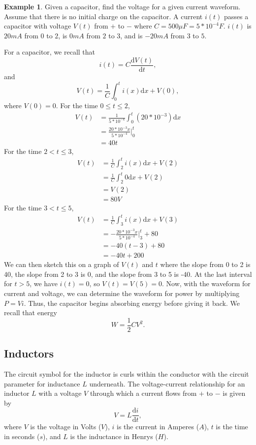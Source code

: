 \documentclass[11pt]{article}
\theoremstyle{plain} %
\theoremstyle{definition}
\theoremstyle{example}
\newtheorem*{example}{Example}
\theoremstyle{remark}
\begin{document}
\begin{example}
Given a capacitor, find the voltage for a given current waveform. Assume that there is no initial charge on the capacitor. A current $i(t)$ passes a capacitor with voltage $V(t)$ from $+$ to $-$ where $C = 500\mu F = 5*10^{-4}F$. $i(t)$ is $20mA$ from $0$ to $2$, is $0mA$ from $2$ to $3$, and is $-20mA$ from $3$ to $5$.
\end{example}

For a capacitor, we recall that $$i(t) = C\frac{\mathrm d V(t)}{\mathrm d t},$$ and $$V(t) = \frac{1}{C}\int_0^ti(x)\mathrm d x + V(0),$$ where $V(0) = 0$. For the time $0 \leq t \leq 2$, 
\begin{align*}
	V(t) &= \frac{1}{5*10^{-4}}\int_0^t\left(20*10^{-3}\right)\mathrm d x\\
	&= \frac{20*10^{-3}x}{5*10^{-4}}\Big|_0^t\\
	&= 40t
\end{align*}
For the time $2 < t \leq 3$,  
\begin{align*}
	V(t) &= \frac{1}{C} \int_2^ti(x) \mathrm d x + V(2)\\
	&= \frac{1}{C}\int_2^t 0 \mathrm d x + V(2)\\
	&= V(2) \\
	&= 80V
\end{align*}
For the time $3 < t \leq 5$, 
\begin{align*}
	V(t) &= \frac{1}{C} \int_3^ti(x) \mathrm d x + V(3)\\
	&= -\frac{20*10^{-3}x}{5*10^{-4}}\Big|_3^t + 80\\
	&= -40(t-3)+80\\
	&= -40t+200
\end{align*}
We can then sketch this on a graph of $V(t)$ and $t$ where the slope from 0 to 2 is 40, the slope from 2 to 3 is 0, and the slope from 3 to 5 is -40. At the last interval for $t>5$, we have $i(t) = 0$, so $V(t) = V(5) = 0$. Now, with the waveform for current and voltage, we can determine the waveform for power by multiplying $P = Vi$. Thus, the capacitor begins absorbing energy before giving it back. We recall that energy 
$$W = \frac{1}{2}CV^2.$$

\subsection{Inductors}

The circuit symbol for the inductor is curls within the conductor with the circuit parameter for inductance $L$ underneath. The voltage-current relationship for an inductor $L$ with a voltage $V$ through which a current flows from $+$ to $-$ is given by 
$$V = L\frac{\mathrm d i}{\mathrm d t},$$
where $V$ is the voltage in Volts ($V$), $i$ is the current in Amperes ($A$), $t$ is the time in seconds ($s$), and $L$ is the inductance in Henrys ($H$). 
\end{document}
